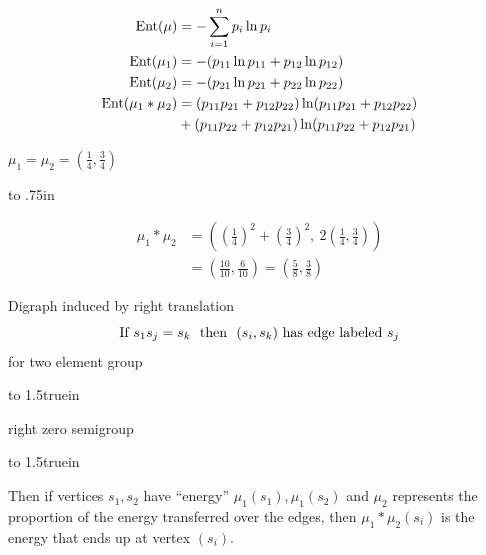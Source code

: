\[
\begin{aligned}
       \hbox{Ent}(\mu) &= -\sum^n_{i=1} p_i \ln p_i            \\
       \hbox{Ent}(\mu_1) &= -(p_{11} \ln p_{11}
                         + p_{12} \ln p_{12})                  \\
       \hbox{Ent}(\mu_2) &= -(p_{21} \ln p_{21}
                         + p_{22} \ln p_{22})                  \\
       \hbox{Ent} (\mu_1 * \mu_2)
          &= (p_{11}p_{21} + p_{12}p_{22})
                         \ln(p_{11}p_{21} + p_{12}p_{22})      \\
          &+ (p_{11}p_{22} + p_{12}p_{21})
                         \ln(p_{11}p_{22} + p_{12}p_{21})
\end{aligned}
\]

\begin{example}	\label{exm:3.3}
$\mu_1 = \mu_2 = \left( \frac{1}{4}, \frac{3}{4} \right)$
\end{example}

\vbox to .75in{}

\[
\begin{aligned}
     \mu_1 * \mu_2 &= \left( \left(\frac{1}{4}\right)^2
          + \left( \frac{3}{4} \right)^2,\
          2\left( \frac{1}{4}, \frac{3}{4} \right) \right)     \\
     &= \left( \frac{10}{10}, \frac{6}{10} \right)
          = \left( \frac{5}{8} , \frac{3}{8} \right)
\end{aligned}
\]


Digraph induced by right translation
\[
     \hbox{If } s_1s_j = s_k \hbox{ \ then \ }
               (s_i,s_k) \hbox{ has edge labeled } s_j
\]
for two element group

\vbox to 1.5truein{}

\noindent
right zero semigroup

\vbox to 1.5truein{}

\noindent
Then if vertices $s_1,s_2$ have ``energy'' $\mu_1(s_1),\mu_1(s_2)$ and
$\mu_2$ represents the proportion of the energy transferred over the
edges, then $\mu_1 * \mu_2(s_i)$ is the energy that ends up at vertex
$(s_i)$.
